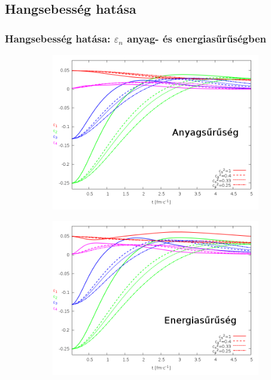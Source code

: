 \documentclass{beamer}
\begin{document}
\subsection{Hangsebesség hatása}
\begin{frame}[noframenumbering]
\frametitle{Hangsebesség hatása: $\varepsilon_n$ anyag- és energiasűrűségben}
\begin{center}
\begin{figure}[H]
	\centering
    \begin{subfigure}[b]{0.49\textwidth}
    		\includegraphics[width=\textwidth]{pic/res/nonrel/eps_cs2_r}
	\end{subfigure}
	\begin{subfigure}[b]{0.49\textwidth}
        	\includegraphics[width=\textwidth]{pic/res/nonrel/eps_cs2_p}
	\end{subfigure}
\end{figure}
\end{center}
\end{frame}
\end{document}
